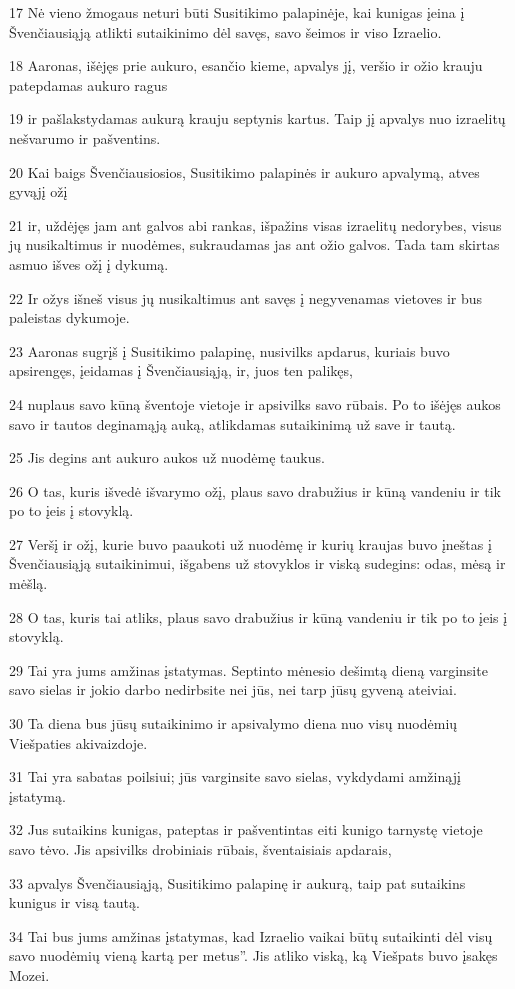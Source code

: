 \par 17 Nė vieno žmogaus neturi būti Susitikimo palapinėje, kai kunigas įeina į Švenčiausiąją atlikti sutaikinimo dėl savęs, savo šeimos ir viso Izraelio. 
\par 18 Aaronas, išėjęs prie aukuro, esančio kieme, apvalys jį, veršio ir ožio krauju patepdamas aukuro ragus 
\par 19 ir pašlakstydamas aukurą krauju septynis kartus. Taip jį apvalys nuo izraelitų nešvarumo ir pašventins. 
\par 20 Kai baigs Švenčiausiosios, Susitikimo palapinės ir aukuro apvalymą, atves gyvąjį ožį 
\par 21 ir, uždėjęs jam ant galvos abi rankas, išpažins visas izraelitų nedorybes, visus jų nusikaltimus ir nuodėmes, sukraudamas jas ant ožio galvos. Tada tam skirtas asmuo išves ožį į dykumą. 
\par 22 Ir ožys išneš visus jų nusikaltimus ant savęs į negyvenamas vietoves ir bus paleistas dykumoje. 
\par 23 Aaronas sugrįš į Susitikimo palapinę, nusivilks apdarus, kuriais buvo apsirengęs, įeidamas į Švenčiausiąją, ir, juos ten palikęs, 
\par 24 nuplaus savo kūną šventoje vietoje ir apsivilks savo rūbais. Po to išėjęs aukos savo ir tautos deginamąją auką, atlikdamas sutaikinimą už save ir tautą. 
\par 25 Jis degins ant aukuro aukos už nuodėmę taukus. 
\par 26 O tas, kuris išvedė išvarymo ožį, plaus savo drabužius ir kūną vandeniu ir tik po to įeis į stovyklą. 
\par 27 Veršį ir ožį, kurie buvo paaukoti už nuodėmę ir kurių kraujas buvo įneštas į Švenčiausiąją sutaikinimui, išgabens už stovyklos ir viską sudegins: odas, mėsą ir mėšlą. 
\par 28 O tas, kuris tai atliks, plaus savo drabužius ir kūną vandeniu ir tik po to įeis į stovyklą. 
\par 29 Tai yra jums amžinas įstatymas. Septinto mėnesio dešimtą dieną varginsite savo sielas ir jokio darbo nedirbsite nei jūs, nei tarp jūsų gyveną ateiviai. 
\par 30 Ta diena bus jūsų sutaikinimo ir apsivalymo diena nuo visų nuodėmių Viešpaties akivaizdoje. 
\par 31 Tai yra sabatas poilsiui; jūs varginsite savo sielas, vykdydami amžinąjį įstatymą. 
\par 32 Jus sutaikins kunigas, pateptas ir pašventintas eiti kunigo tarnystę vietoje savo tėvo. Jis apsivilks drobiniais rūbais, šventaisiais apdarais, 
\par 33 apvalys Švenčiausiąją, Susitikimo palapinę ir aukurą, taip pat sutaikins kunigus ir visą tautą. 
\par 34 Tai bus jums amžinas įstatymas, kad Izraelio vaikai būtų sutaikinti dėl visų savo nuodėmių vieną kartą per metus”. Jis atliko viską, ką Viešpats buvo įsakęs Mozei.



